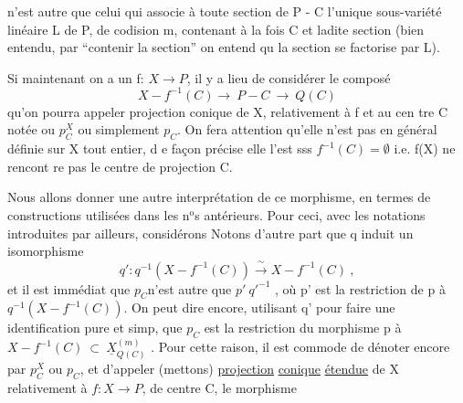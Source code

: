 
n'est autre que celui qui associe à toute section de  P - C  l'unique
sous-variété linéaire  L de P, de codision m, contenant à la fois C
et ladite section  (bien entendu, par ``contenir la section'' on entend qu
la section se factorise par L).

Si maintenant on a un f: $X \longrightarrow P$,  il y a lieu de considérer le
composé
\[ X - f^{-1}(C) \longrightarrow\ P - C \ \longrightarrow\ Q(C) \]
qu'on pourra appeler projection conique de X, relativement à f et au cen%
tre C\hand{,} notée  ou $p^{X}_{C}$ ou simplement $p_{C}$. \hand{(}On fera attention qu'elle n'est pas en général définie sur X tout
entier, d e façon précise elle l'est sss $f^{-1}(C)=\emptyset$ i.e. f(X) ne rencont re
pas le centre de projection C. \hand{\unsure{)}}

Nous allons donner une autre interprétation de ce morphisme, en
termes de constructions utilisées dans les n$^{\text{o}}$s antérieurs.  Pour ceci,
avec les notations introduites par ailleurs, considérons
Notons d'autre part que  q  induit un  isomorphisme
\[ q':q^{-1}(X-f^{-1}(C)) \xrightarrow{\ \sim\ } X - f^{-1}(C) \ , \]
et il est immédiat que  $p_{C}$n'est autre  que   $p'\ q'^{-1}$ , où p' est la
restriction de  p à  $q^{-1}(X-f^{-1}(C))$.  On peut dire encore, utilisant q'
pour faire une identification pure et simp, que  $p_{C}$ est la restriction
du morphisme p  à  $X - f^{-1}(C) \ \subset\ \underline{X}^{(m)}_{Q(C)}$ . Pour cette raison, il est
commode de dénoter encore par  $p^{X}_{C}$ ou $p_{C}$, et d'appeler  (mettons)  \uline{projection}
\uline{conique}  \uline{étendue}  de X\hand{,} relativement à $f:X\rightarrow P$, de centre C, le morphisme

